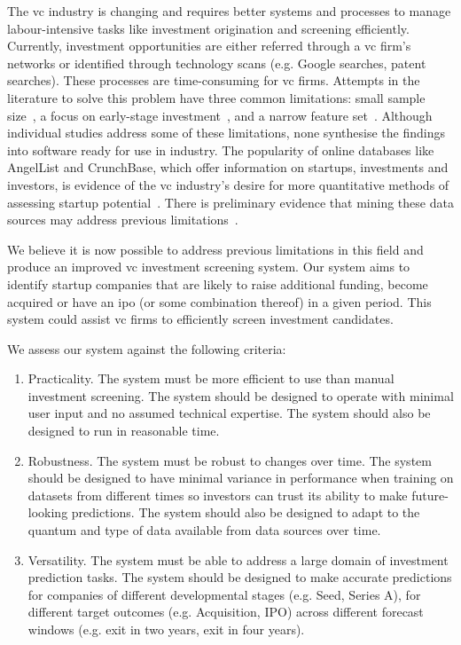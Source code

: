 \documentclass[../thesis/thesis.tex]{subfiles}
\begin{document}
The \gls{vc} industry is changing and requires better systems and processes to manage labour-intensive tasks like investment origination and screening efficiently. Currently, investment opportunities are either referred through a \gls{vc} firm's networks or identified through technology scans (e.g. Google searches, patent searches). These processes are time-consuming for \gls{vc} firms. Attempts in the literature to solve this problem have three common limitations: small sample size~\cite{ahlers2015, gimmon2010, hoenen2014, yu2015, an2015, werth2013, croce2016}, a focus on early-stage investment~\cite{beckwith2016, ahlers2015, cheng2016, yuan2016, croce2016, stone2014}, and a narrow feature set~\cite{ahlers2015, an2015, cheng2016, croce2016, werth2013, gimmon2010}. Although individual studies address some of these limitations, none synthesise the findings into software ready for use in industry. The popularity of online databases like AngelList and CrunchBase, which offer information on startups, investments and investors, is evidence of the \gls{vc} industry's desire for more quantitative methods of assessing startup potential~\cite{patil2015}. There is preliminary evidence that mining these data sources may address previous limitations~\cite{stone2014,bhat2011}.

We believe it is now possible to address previous limitations in this field and produce an improved \gls{vc} investment screening system. Our system aims to identify startup companies that are likely to raise additional funding, become acquired or have an \gls{ipo} (or some combination thereof) in a given period. This system could assist \gls{vc} firms to efficiently screen investment candidates.

We assess our system against the following criteria:

\begin{enumerate}

\item Practicality. The system must be more efficient to use than manual investment screening. The system should be designed to operate with minimal user input and no assumed technical expertise. The system should also be designed to run in reasonable time.

\item Robustness. The system must be robust to changes over time. The system should be designed to have minimal variance in performance when training on datasets from different times so investors can trust its ability to make future-looking predictions. The system should also be designed to adapt to the quantum and type of data available from data sources over time.

\item Versatility. The system must be able to address a large domain of investment prediction tasks. The system should be designed to make accurate predictions for companies of different developmental stages (e.g. Seed, Series A), for different target outcomes (e.g. Acquisition, IPO) across different forecast windows (e.g. exit in two years, exit in four years).

\end{enumerate}
\end{document}
